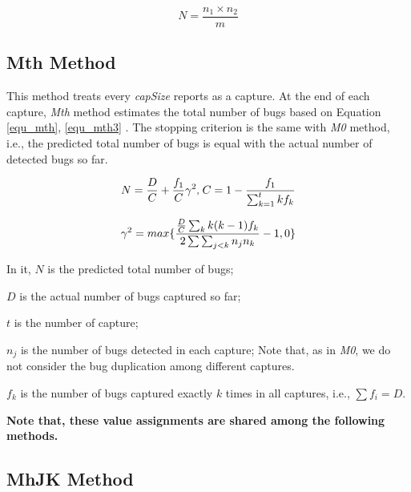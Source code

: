 \documentclass[sigconf,review, anonymous]{acmart}
\begin{document}
\begin{equation}\label{equ_CRC}
N = \frac{n_1 \times n_2}{m}
\end{equation}


\subsection{Mth Method}
\label{subsec:method_Mth}

This method treats every \textit{capSize} reports as a capture.
At the end of each capture, \textit{Mth} method estimates the total number of bugs based on Equation \ref{equ_mth}, \ref{equ_mth3} \cite{Mthlee1996estimating}.
The stopping criterion is the same with \textit{M0} method, i.e., the predicted total number of bugs is equal with the actual number of detected bugs so far.

\begin{equation}\label{equ_mth}
\footnotesize{ N = \frac{D}{C} + \frac{f_1}{C}\gamma^2 } \mbox{, } \footnotesize{ C = 1 - \frac{f_1}{\sum_{k=1}^{t}kf_k} } \\
\end{equation}

\begin{equation}\label{equ_mth3}
\footnotesize{ \gamma^2 = max\{{\frac{\frac{D}{C}\sum_{k}k(k-1)f_k}{2\sum\sum_{j<k}n_jn_k}-1, 0}\} }
\end{equation}

In it, $N$ is the predicted total number of bugs;

$D$ is the actual number of bugs captured so far;

$t$ is the number of capture;

$n_j$ is the number of bugs detected in each capture; Note that, as in \textit{M0}, we do not consider the bug duplication among different captures.

$f_k$ is the number of bugs captured exactly $k$ times in all captures, i.e., $\sum f_i = D$.

\textbf{Note that, these value assignments are shared among the following methods.}

\subsection{MhJK Method}
\label{subsec:method_MhJK}
\end{document}
